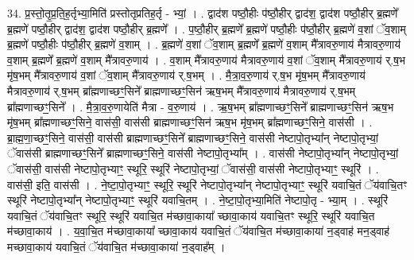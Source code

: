 \documentclass[17pt]{extarticle}
\begin{document}
34. प्र॒स्तो॒तृ॒प्र॒ति॒ह॒र्तृभ्या॒मिति॑ प्रस्तोतृप्रतिह॒र्तृ - भ्यां॒ । . द्वाद॑श पष्ठौ॒हीः प॑ष्ठौ॒हीर् द्वाद॑श॒ द्वाद॑श पष्ठौ॒हीर् ब्र॒ह्मणे᳚ ब्र॒ह्मणे॑ पष्ठौ॒हीर् द्वाद॑श॒ द्वाद॑श पष्ठौ॒हीर् ब्र॒ह्मणे᳚ । . प॒ष्ठौ॒हीर् ब्र॒ह्मणे᳚ ब्र॒ह्मणे॑ पष्ठौ॒हीः प॑ष्ठौ॒हीर् ब्र॒ह्मणे॑ व॒शां ॅव॒शाम् ब्र॒ह्मणे॑ पष्ठौ॒हीः प॑ष्ठौ॒हीर् ब्र॒ह्मणे॑ व॒शाम् । . ब्र॒ह्मणे॑ व॒शां ॅव॒शाम् ब्र॒ह्मणे᳚ ब्र॒ह्मणे॑ व॒शाम् मै᳚त्रावरु॒णाय॑ मैत्रावरु॒णाय॑ व॒शाम् ब्र॒ह्मणे᳚ ब्र॒ह्मणे॑ व॒शाम् मै᳚त्रावरु॒णाय॑ । . व॒शाम् मै᳚त्रावरु॒णाय॑ मैत्रावरु॒णाय॑ व॒शां ॅव॒शाम् मै᳚त्रावरु॒णाय॑ र्.ष॒भ मृ॑ष॒भम् मै᳚त्रावरु॒णाय॑ व॒शां ॅव॒शाम् मै᳚त्रावरु॒णाय॑ र्.ष॒भम् । . मै॒त्रा॒व॒रु॒णाय॑ र्.ष॒भ मृ॑ष॒भम् मै᳚त्रावरु॒णाय॑ मैत्रावरु॒णाय॑ र्.ष॒भम् ब्रा᳚ह्मणाच्छꣳ॒॒सिने᳚ ब्राह्मणाच्छꣳ॒॒सिन॑ ऋष॒भम् मै᳚त्रावरु॒णाय॑ मैत्रावरु॒णाय॑ र्.ष॒भम् ब्रा᳚ह्मणाच्छꣳ॒॒सिने᳚ । . मै॒त्रा॒व॒रु॒णायेति॑ मैत्रा - व॒रु॒णाय॑ । . ऋ॒ष॒भम् ब्रा᳚ह्मणाच्छꣳ॒॒सिने᳚ ब्राह्मणाच्छꣳ॒॒सिन॑ ऋष॒भ मृ॑ष॒भम् ब्रा᳚ह्मणाच्छꣳ॒॒सिने॒ वास॑सी॒ वास॑सी ब्राह्मणाच्छꣳ॒॒सिन॑ ऋष॒भ मृ॑ष॒भम् ब्रा᳚ह्मणाच्छꣳ॒॒सिने॒ वास॑सी । . ब्रा॒ह्म॒णा॒च्छꣳ॒॒सिने॒ वास॑सी॒ वास॑सी ब्राह्मणाच्छꣳ॒॒सिने᳚ ब्राह्मणाच्छꣳ॒॒सिने॒ वास॑सी नेष्टापो॒तृभ्या᳚न् नेष्टापो॒तृभ्यां॒ ॅवास॑सी ब्राह्मणाच्छꣳ॒॒सिने᳚ ब्राह्मणाच्छꣳ॒॒सिने॒ वास॑सी नेष्टापो॒तृभ्या᳚म् । . वास॑सी नेष्टापो॒तृभ्या᳚न् नेष्टापो॒तृभ्यां॒ ॅवास॑सी॒ वास॑सी नेष्टापो॒तृभ्याꣳ॒॒ स्थूरि॒ स्थूरि॑ नेष्टापो॒तृभ्यां॒ ॅवास॑सी॒ वास॑सी नेष्टापो॒तृभ्याꣳ॒॒ स्थूरि॑ । . वास॑सी॒ इति॒ वास॑सी । . ने॒ष्टा॒पो॒तृभ्याꣳ॒॒ स्थूरि॒ स्थूरि॑ नेष्टापो॒तृभ्या᳚न् नेष्टापो॒तृभ्याꣳ॒॒ स्थूरि॑ यवाचि॒तं ॅय॑वाचि॒तꣳ स्थूरि॑ नेष्टापो॒तृभ्या᳚न् नेष्टापो॒तृभ्याꣳ॒॒ स्थूरि॑ यवाचि॒तम् । . ने॒ष्टा॒पो॒तृभ्या॒मिति॑ नेष्टापो॒तृ - भ्या॒म् । . स्थूरि॑ यवाचि॒तं ॅय॑वाचि॒तꣳ स्थूरि॒ स्थूरि॑ यवाचि॒त म॑च्छावा॒काया᳚ च्छावा॒काय॑ यवाचि॒तꣳ स्थूरि॒ स्थूरि॑ यवाचि॒त म॑च्छावा॒काय॑ । . य॒वा॒चि॒त म॑च्छावा॒काया᳚ च्छावा॒काय॑ यवाचि॒तं ॅय॑वाचि॒त म॑च्छावा॒काया॑ न॒ड्वाह॑ मन॒ड्वाह॑ 
मच्छावा॒काय॑ यवाचि॒तं ॅय॑वाचि॒त म॑च्छावा॒काया॑ न॒ड्वाह᳚म् । \newline
\end{document}
